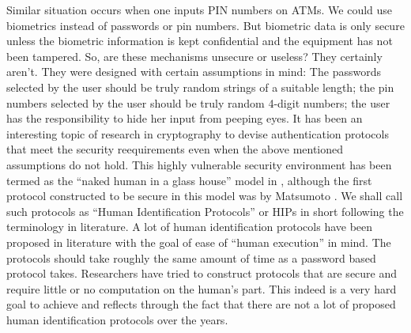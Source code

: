 \documentclass{llncs}
\begin{document}
Similar situation occurs when one inputs PIN numbers on ATMs. We could use biometrics instead of passwords or pin numbers. But biometric data is only secure unless the biometric information is kept confidential and the equipment has not been tampered. So, are these mechanisms unsecure or useless? They certainly aren't. They were designed with certain assumptions in mind: The passwords selected by the user should be truly random strings of a suitable length; the pin numbers selected by the user should be truly random 4-digit numbers; the user has the responsibility to hide her input from peeping eyes. It has been an interesting topic of research in cryptography to devise authentication protocols that meet the security reequirements even when the above mentioned assumptions do not hold. This highly vulnerable security  environment has been termed as the ``naked human in a glass house'' model in \cite{humanoid}, although the first protocol constructed to be secure in this model was by Matsumoto \cite{mat:ima}. We shall call such protocols as ``Human Identification Protocols'' or HIPs in short following the terminology in literature. A lot of human identification protocols have been proposed in literature with the goal of ease of ``human execution'' in mind. The protocols should take roughly the same amount of time as a password based protocol takes. Researchers have tried to construct protocols that are secure and require little or no computation on the human's part. This indeed is a very hard goal to achieve and reflects through the fact that there are not a lot of proposed human identification protocols over the years.
\end{document}
